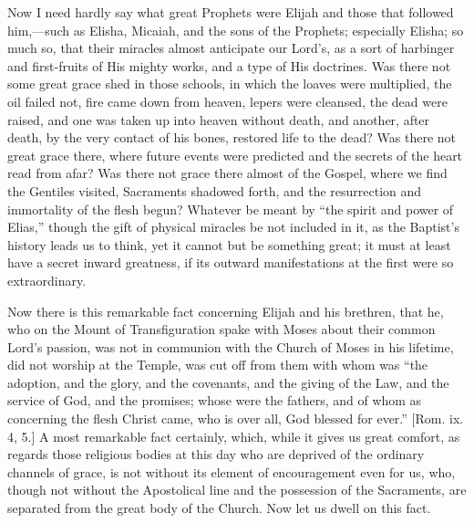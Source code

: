 Now I need hardly say what great Prophets were Elijah and those
that followed him,—such as Elisha, Micaiah, and the sons of the
Prophets; especially Elisha; so much so, that their miracles almost
anticipate our Lord's, as a sort of harbinger and first-fruits of His
mighty works, and a type of His doctrines. Was there not some great
grace shed in those schools, in which the loaves were multiplied, the
oil failed not, fire came down from heaven, lepers were cleansed, the
dead were raised, and one was taken up into heaven without death, and
another, after death, by the very contact of his bones, restored life
to the dead? Was there not great grace there, where future events were
predicted and the secrets of the heart read from afar? Was there not
grace there almost of the Gospel, where we find the Gentiles visited,
Sacraments shadowed forth, and the resurrection and immortality of the
flesh begun? Whatever be meant by ``the spirit and power of
Elias,'' though the gift of physical miracles be not included in
it, as the Baptist's history leads us to think, yet it cannot but be
something great; it must at least have a secret inward greatness, if
its outward manifestations at the first were so extraordinary.

Now there is this remarkable fact concerning Elijah and his
brethren, that he, who on the Mount of Transfiguration spake with
Moses about their common Lord's passion, was not in communion with the
Church of Moses in his lifetime, did not worship at the Temple, was
cut off from them with whom was ``the adoption, and the glory, and
the covenants, and the giving of the Law, and the service of God, and
the promises; whose were the fathers, and of whom as concerning the
flesh Christ came, who is over all, God blessed for ever.'' [Rom.
ix. 4, 5.] A most remarkable fact certainly, which, while it gives us
great comfort, as regards those religious bodies at this day who are
deprived of the ordinary channels of grace, is not without its element
of encouragement even for us, who, though not without the Apostolical
line and the possession of the Sacraments, are separated from the
great body of the Church. Now let us dwell on this fact.

